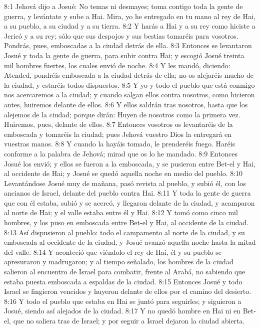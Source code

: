 8:1 Jehová dijo a Josué: No temas ni desmayes; toma contigo toda la gente de guerra, y levántate y sube a Hai. Mira, yo he entregado en tu mano al rey de Hai, a su pueblo, a su ciudad y a su tierra.  
8:2 Y harás a Hai y a su rey como hiciste a Jericó y a su rey; sólo que sus despojos y sus bestias tomaréis para vosotros. Pondrás, pues, emboscadas a la ciudad detrás de ella.  
8:3 Entonces se levantaron Josué y toda la gente de guerra, para subir contra Hai; y escogió Josué treinta mil hombres fuertes, los cuales envió de noche.  
8:4 Y les mandó, diciendo: Atended, pondréis emboscada a la ciudad detrás de ella; no os alejaréis mucho de la ciudad, y estaréis todos dispuestos.  
8:5 Y yo y todo el pueblo que está conmigo nos acercaremos a la ciudad; y cuando salgan ellos contra nosotros, como hicieron antes, huiremos delante de ellos.  
8:6 Y ellos saldrán tras nosotros, hasta que los alejemos de la ciudad; porque dirán: Huyen de nosotros como la primera vez. Huiremos, pues, delante de ellos.  
8:7 Entonces vosotros os levantaréis de la emboscada y tomaréis la ciudad; pues Jehová vuestro Dios la entregará en vuestras manos.  
8:8 Y cuando la hayáis tomado, le prenderéis fuego. Haréis conforme a la palabra de Jehová; mirad que os lo he mandado.  
8:9 Entonces Josué los envió; y ellos se fueron a la emboscada, y se pusieron entre Bet-el y Hai, al occidente de Hai; y Josué se quedó aquella noche en medio del pueblo.  
8:10 Levantándose Josué muy de mañana, pasó revista al pueblo, y subió él, con los ancianos de Israel, delante del pueblo contra Hai.  
8:11 Y toda la gente de guerra que con él estaba, subió y se acercó, y llegaron delante de la ciudad, y acamparon al norte de Hai; y el valle estaba entre él y Hai.  
8:12 Y tomó como cinco mil hombres, y los puso en emboscada entre Bet-el y Hai, al occidente de la ciudad.  
8:13 Así dispusieron al pueblo: todo el campamento al norte de la ciudad, y su emboscada al occidente de la ciudad, y Josué avanzó aquella noche hasta la mitad del valle.  
8:14 Y aconteció que viéndolo el rey de Hai, él y su pueblo se apresuraron y madrugaron; y al tiempo señalado, los hombres de la ciudad salieron al encuentro de Israel para combatir, frente al Arabá, no sabiendo que estaba puesta emboscada a espaldas de la ciudad.  
8:15 Entonces Josué y todo Israel se fingieron vencidos y huyeron delante de ellos por el camino del desierto.  
8:16 Y todo el pueblo que estaba en Hai se juntó para seguirles; y siguieron a Josué, siendo así alejados de la ciudad. 
8:17 Y no quedó hombre en Hai ni en Bet-el, que no saliera tras de Israel; y por seguir a Israel dejaron la ciudad abierta.  
